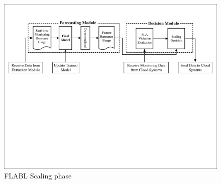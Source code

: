 \documentclass[runningheads]{llncs}
\begin{document}
\begin{figure}
	\begin{center}
		\includegraphics[width=1.0\textwidth =0cm 0cm 0cm 0cm, clip]{images/pdf/Forecasting_Module.pdf}
		\caption{FLABL Scaling phase}
		\label{FLABLscaling}
	\end{center}
\end{figure}
\end{document}
